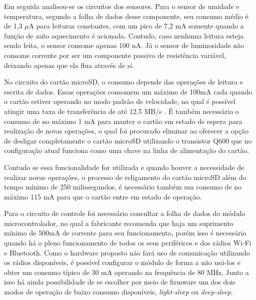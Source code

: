 Em seguida analisou-se os circuitos dos sensores. Para o sensor de umidade e temperatura, segundo a folha de dados desse componente, seu consumo médio é de 1,3 $\mu$A para leituras constantes, com um pico de 7,2 mA somente quando a função de auto aquecimento é acionada. Contudo, caso nenhuma leitura esteja sendo feita, o sensor consome apenas 100 nA. Já o sensor de luminosidade não consome corrente por ser um componente passivo de resistência variável, deixando apenas que ela flua através de si.

No circuito do cartão microSD, o consumo depende das operações de leitura e escrita de dados. Essas operações consomem um máximo de 100mA cada quando o cartão estiver operando no modo padrão de velocidade, no qual é possível atingir uma taxa de transferência de até 12.5 MB/s \cite{sd3sd}. É também necessário o consumo de no máximo 1 mA para manter o cartão em estado de espera para realização de novas operações, o qual foi procurado eliminar ao oferecer a opção de desligar completamente o cartão microSD utilizando o transistor Q600 que no configuração atual funciona como uma chave na linha de alimentação do cartão.

Contudo se essa funcionalidade for utilizada e quando houver a necessidade de realizar novas operações, o processo de religamento do cartão microSD além do tempo mínimo de 250 milissegundos, é necessário também um consumo de no máximo 115 mA para que o cartão entre em estado de operação. 

Para o circuito de controle foi necessário consultar a folha de dados do módulo microcontrolador, no qual a fabricante recomenda que haja um suprimento mínimo de 500mA de corrente para seu funcionamento, porém isso é necessário quando há o pleno funcionamento de todos os seus periféricos e dos rádios Wi-Fi e Bluetooth. Como o hardware proposto não fará uso de comunicação utilizando os rádios disponíveis, é possível configurar o módulo de forma a não usá-los e obter um consumo típico de 30 mA operando na frequência de 80 MHz. Junto a isso há ainda possibilidade de se escolher por meio de firmware um dos dois modos de operação de baixo consumo disponíveis, \textit{light-sleep} ou \textit{deep-sleep}. 

